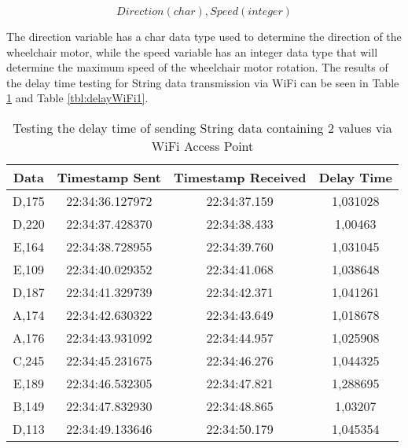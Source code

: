 \begin{equation}
  \label{eq:string-2Data}
    Direction(char),Speed(integer)
\end{equation}

The direction variable has a char data type used to determine the direction of the wheelchair motor, while the speed variable has an integer data type that will determine the maximum speed of the wheelchair motor rotation. The results of the delay time testing for String data transmission via WiFi can be seen in Table \ref{tbl:delayWiFi2} and Table \ref{tbl:delayWiFi1}.

\begin{table}[!h]
\centering
  \caption{Testing the delay time of sending String data containing 2 values via WiFi Access Point}
  \label{tbl:delayWiFi2}
  \begin{tabular}{|ccc|c|}
  \hline
  \multicolumn{1}{|c|}{Data}  & \multicolumn{1}{c|}{Timestamp Sent}  & Timestamp Received & Delay Time  \\ \hline
  \multicolumn{1}{|c|}{D,175} & \multicolumn{1}{c|}{22:34:36.127972} & 22:34:37.159       & 1,031028    \\ \hline
  \multicolumn{1}{|c|}{D,220} & \multicolumn{1}{c|}{22:34:37.428370} & 22:34:38.433       & 1,00463     \\ \hline
  \multicolumn{1}{|c|}{E,164} & \multicolumn{1}{c|}{22:34:38.728955} & 22:34:39.760       & 1,031045    \\ \hline
  \multicolumn{1}{|c|}{E,109} & \multicolumn{1}{c|}{22:34:40.029352} & 22:34:41.068       & 1,038648    \\ \hline
  \multicolumn{1}{|c|}{D,187} & \multicolumn{1}{c|}{22:34:41.329739} & 22:34:42.371       & 1,041261    \\ \hline
  \multicolumn{1}{|c|}{A,174} & \multicolumn{1}{c|}{22:34:42.630322} & 22:34:43.649       & 1,018678    \\ \hline
  \multicolumn{1}{|c|}{A,176} & \multicolumn{1}{c|}{22:34:43.931092} & 22:34:44.957       & 1,025908    \\ \hline
  \multicolumn{1}{|c|}{C,245} & \multicolumn{1}{c|}{22:34:45.231675} & 22:34:46.276       & 1,044325    \\ \hline
  \multicolumn{1}{|c|}{E,189} & \multicolumn{1}{c|}{22:34:46.532305} & 22:34:47.821       & 1,288695    \\ \hline
  \multicolumn{1}{|c|}{B,149} & \multicolumn{1}{c|}{22:34:47.832930} & 22:34:48.865       & 1,03207     \\ \hline
  \multicolumn{1}{|c|}{D,113} & \multicolumn{1}{c|}{22:34:49.133646} & 22:34:50.179       & 1,045354    \\ \hline

\end{tabular}
\end{table}
